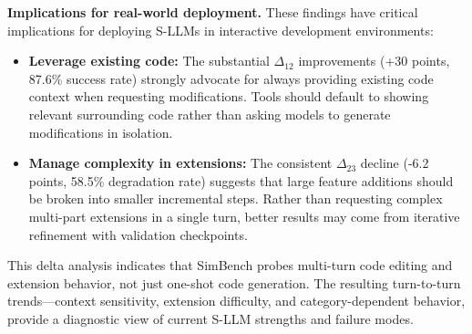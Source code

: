\textbf{Implications for real-world deployment.}
These findings have critical implications for deploying S-LLMs in interactive development environments:

\begin{itemize}
    \item \textbf{Leverage existing code:} The substantial $\Delta_{12}$ improvements (+30 points, 87.6\% success rate) strongly advocate for always providing existing code context when requesting modifications. Tools should default to showing relevant surrounding code rather than asking models to generate modifications in isolation.
    
    \item \textbf{Manage complexity in extensions:} The consistent $\Delta_{23}$ decline (-6.2 points, 58.5\% degradation rate) suggests that large feature additions should be broken into smaller incremental steps. Rather than requesting complex multi-part extensions in a single turn, better results may come from iterative refinement with validation checkpoints.
\end{itemize}

This delta analysis indicates that SimBench probes multi-turn code editing and extension behavior, not just one-shot code generation. The resulting turn-to-turn trends—context sensitivity, extension difficulty, and category-dependent behavior, provide a diagnostic view of current S-LLM strengths and failure modes.


